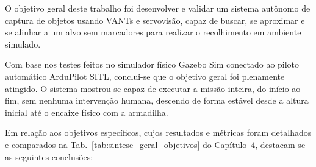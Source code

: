 
O objetivo geral deste trabalho foi desenvolver e validar um sistema autônomo de captura de objetos usando VANTs e servovisão, capaz de buscar, se aproximar e se alinhar a um alvo sem marcadores para realizar o recolhimento em ambiente simulado. 

Com base nos testes feitos no simulador físico Gazebo Sim conectado ao piloto automático ArduPilot SITL, conclui-se que o objetivo geral foi plenamente atingido. O sistema mostrou-se capaz de executar a missão inteira, do início ao fim, sem nenhuma intervenção humana, descendo de forma estável desde a altura inicial até o encaixe físico com a armadilha.

Em relação aos objetivos específicos, cujos resultados e métricas foram detalhados e comparados na Tab.~\ref{tab:sintese_geral_objetivos} do Capítulo~4, destacam-se as seguintes conclusões:


